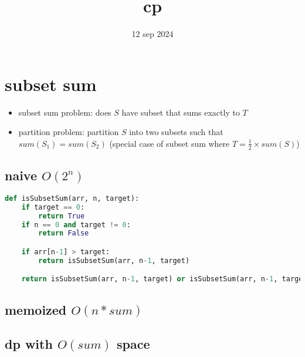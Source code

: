 \documentclass[11pt]{article}
\begin{document}
\title{cp}
\author{}
\date{12 sep 2024}
\maketitle

\newpage


\section{subset sum}

\begin{flushleft}

\begin{itemize}
\item subset sum problem: does $S$ have subset that sums exactly to $T$ 
\item partition problem: partition $S$ into two subsets such that $sum(S_{1}) = sum(S_{2})$ (special case of subset sum where $T = \frac{1}{2}\times sum(S)$)
\end{itemize}

\end{flushleft}

\subsection{naive $O(2^{n})$}
\begin{lstlisting}[language=Python]
def isSubsetSum(arr, n, target):
    if target == 0:
        return True
    if n == 0 and target != 0:
        return False

    if arr[n-1] > target:
        return isSubsetSum(arr, n-1, target)

    return isSubsetSum(arr, n-1, target) or isSubsetSum(arr, n-1, target - arr[n-1])
\end{lstlisting}

\subsection{memoized $O(n*sum)$}

\subsection{dp with $O(sum)$ space}
\end{document}
